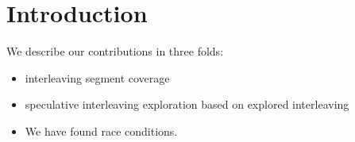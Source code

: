 \section{Introduction}
\label{s:intro}





We describe our contributions in three folds:

\begin{itemize}
\item interleaving segment coverage
\item speculative interleaving exploration based on explored interleaving
\item We have found \totalbugs race conditions.
\end{itemize}


